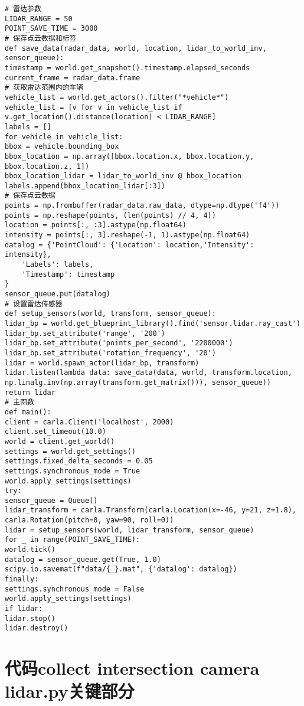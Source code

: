 \begin{lstlisting}
# 雷达参数
LIDAR_RANGE = 50
POINT_SAVE_TIME = 3000
# 保存点云数据和标签
def save_data(radar_data, world, location, lidar_to_world_inv, sensor_queue):
timestamp = world.get_snapshot().timestamp.elapsed_seconds
current_frame = radar_data.frame
# 获取雷达范围内的车辆
vehicle_list = world.get_actors().filter("*vehicle*")
vehicle_list = [v for v in vehicle_list if v.get_location().distance(location) < LIDAR_RANGE]
labels = []
for vehicle in vehicle_list:
bbox = vehicle.bounding_box
bbox_location = np.array([bbox.location.x, bbox.location.y, bbox.location.z, 1])
bbox_location_lidar = lidar_to_world_inv @ bbox_location
labels.append(bbox_location_lidar[:3])
# 保存点云数据
points = np.frombuffer(radar_data.raw_data, dtype=np.dtype('f4'))
points = np.reshape(points, (len(points) // 4, 4))
location = points[:, :3].astype(np.float64)
intensity = points[:, 3].reshape(-1, 1).astype(np.float64)
datalog = {'PointCloud': {'Location': location,'Intensity': intensity},
	'Labels': labels,
	'Timestamp': timestamp
}
sensor_queue.put(datalog)
# 设置雷达传感器
def setup_sensors(world, transform, sensor_queue):
lidar_bp = world.get_blueprint_library().find('sensor.lidar.ray_cast')
lidar_bp.set_attribute('range', '200')
lidar_bp.set_attribute('points_per_second', '2200000')
lidar_bp.set_attribute('rotation_frequency', '20')
lidar = world.spawn_actor(lidar_bp, transform)
lidar.listen(lambda data: save_data(data, world, transform.location, np.linalg.inv(np.array(transform.get_matrix())), sensor_queue))
return lidar
# 主函数
def main():
client = carla.Client('localhost', 2000)
client.set_timeout(10.0)
world = client.get_world()
settings = world.get_settings()
settings.fixed_delta_seconds = 0.05
settings.synchronous_mode = True
world.apply_settings(settings)
try:
sensor_queue = Queue()
lidar_transform = carla.Transform(carla.Location(x=-46, y=21, z=1.8), carla.Rotation(pitch=0, yaw=90, roll=0))
lidar = setup_sensors(world, lidar_transform, sensor_queue)
for _ in range(POINT_SAVE_TIME):
world.tick()
datalog = sensor_queue.get(True, 1.0)
scipy.io.savemat(f"data/{_}.mat", {'datalog': datalog})
finally:
settings.synchronous_mode = False
world.apply_settings(settings)
if lidar:
lidar.stop()
lidar.destroy()
\end{lstlisting}


\section{代码collect intersection camera lidar.py关键部分}

